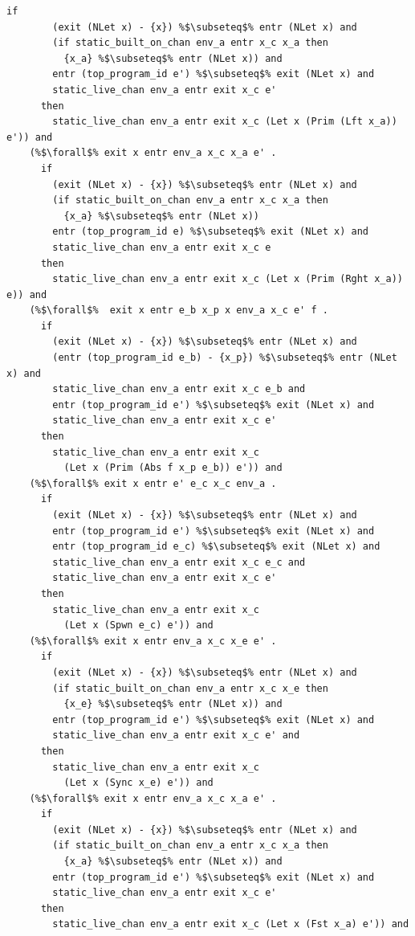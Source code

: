 \documentclass{article}
\begin{document}
\begin{lstlisting}[language=logic, escapechar=\%]
      if
        (exit (NLet x) - {x}) %$\subseteq$% entr (NLet x) and
        (if static_built_on_chan env_a entr x_c x_a then
          {x_a} %$\subseteq$% entr (NLet x)) and
        entr (top_program_id e') %$\subseteq$% exit (NLet x) and
        static_live_chan env_a entr exit x_c e'
      then
        static_live_chan env_a entr exit x_c (Let x (Prim (Lft x_a)) e')) and
    (%$\forall$% exit x entr env_a x_c x_a e' . 
      if
        (exit (NLet x) - {x}) %$\subseteq$% entr (NLet x) and
        (if static_built_on_chan env_a entr x_c x_a then
          {x_a} %$\subseteq$% entr (NLet x))
        entr (top_program_id e) %$\subseteq$% exit (NLet x) and
        static_live_chan env_a entr exit x_c e
      then
        static_live_chan env_a entr exit x_c (Let x (Prim (Rght x_a)) e)) and
    (%$\forall$%  exit x entr e_b x_p x env_a x_c e' f . 
      if
        (exit (NLet x) - {x}) %$\subseteq$% entr (NLet x) and
        (entr (top_program_id e_b) - {x_p}) %$\subseteq$% entr (NLet x) and
        static_live_chan env_a entr exit x_c e_b and
        entr (top_program_id e') %$\subseteq$% exit (NLet x) and
        static_live_chan env_a entr exit x_c e'
      then
        static_live_chan env_a entr exit x_c
          (Let x (Prim (Abs f x_p e_b)) e')) and
    (%$\forall$% exit x entr e' e_c x_c env_a .
      if
        (exit (NLet x) - {x}) %$\subseteq$% entr (NLet x) and
        entr (top_program_id e') %$\subseteq$% exit (NLet x) and
        entr (top_program_id e_c) %$\subseteq$% exit (NLet x) and
        static_live_chan env_a entr exit x_c e_c and
        static_live_chan env_a entr exit x_c e'
      then
        static_live_chan env_a entr exit x_c
          (Let x (Spwn e_c) e')) and
    (%$\forall$% exit x entr env_a x_c x_e e' .
      if
        (exit (NLet x) - {x}) %$\subseteq$% entr (NLet x) and
        (if static_built_on_chan env_a entr x_c x_e then
          {x_e} %$\subseteq$% entr (NLet x)) and
        entr (top_program_id e') %$\subseteq$% exit (NLet x) and
        static_live_chan env_a entr exit x_c e' and
      then
        static_live_chan env_a entr exit x_c
          (Let x (Sync x_e) e')) and
    (%$\forall$% exit x entr env_a x_c x_a e' .
      if
        (exit (NLet x) - {x}) %$\subseteq$% entr (NLet x) and
        (if static_built_on_chan env_a entr x_c x_a then
          {x_a} %$\subseteq$% entr (NLet x)) and
        entr (top_program_id e') %$\subseteq$% exit (NLet x) and
        static_live_chan env_a entr exit x_c e'
      then
        static_live_chan env_a entr exit x_c (Let x (Fst x_a) e')) and


\end{lstlisting}
\end{document}
